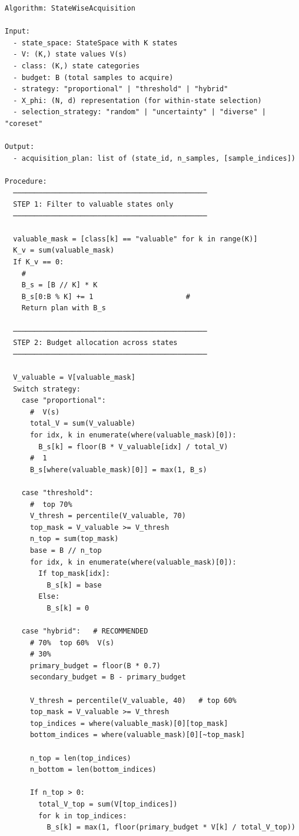 \documentclass[
  12pt,
]{article}
\begin{document}
\begin{verbatim}
Algorithm: StateWiseAcquisition

Input:
  - state_space: StateSpace with K states
  - V: (K,) state values V(s)
  - class: (K,) state categories
  - budget: B (total samples to acquire)
  - strategy: "proportional" | "threshold" | "hybrid"
  - X_phi: (N, d) representation (for within-state selection)
  - selection_strategy: "random" | "uncertainty" | "diverse" | "coreset"

Output:
  - acquisition_plan: list of (state_id, n_samples, [sample_indices])

Procedure:
  ──────────────────────────────────────────────
  STEP 1: Filter to valuable states only
  ──────────────────────────────────────────────

  valuable_mask = [class[k] == "valuable" for k in range(K)]
  K_v = sum(valuable_mask)
  If K_v == 0:
    # 
    B_s = [B // K] * K
    B_s[0:B % K] += 1                      # 
    Return plan with B_s

  ──────────────────────────────────────────────
  STEP 2: Budget allocation across states
  ──────────────────────────────────────────────

  V_valuable = V[valuable_mask]
  Switch strategy:
    case "proportional":
      #  V(s) 
      total_V = sum(V_valuable)
      for idx, k in enumerate(where(valuable_mask)[0]):
        B_s[k] = floor(B * V_valuable[idx] / total_V)
      #  1 
      B_s[where(valuable_mask)[0]] = max(1, B_s)

    case "threshold":
      #  top 70% 
      V_thresh = percentile(V_valuable, 70)
      top_mask = V_valuable >= V_thresh
      n_top = sum(top_mask)
      base = B // n_top
      for idx, k in enumerate(where(valuable_mask)[0]):
        If top_mask[idx]:
          B_s[k] = base
        Else:
          B_s[k] = 0

    case "hybrid":   # RECOMMENDED
      # 70%  top 60%  V(s) 
      # 30% 
      primary_budget = floor(B * 0.7)
      secondary_budget = B - primary_budget

      V_thresh = percentile(V_valuable, 40)   # top 60%
      top_mask = V_valuable >= V_thresh
      top_indices = where(valuable_mask)[0][top_mask]
      bottom_indices = where(valuable_mask)[0][~top_mask]

      n_top = len(top_indices)
      n_bottom = len(bottom_indices)

      If n_top > 0:
        total_V_top = sum(V[top_indices])
        for k in top_indices:
          B_s[k] = max(1, floor(primary_budget * V[k] / total_V_top))


\end{verbatim}
\end{document}
